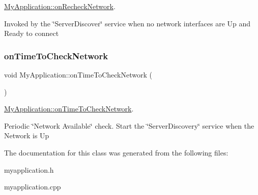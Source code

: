 \mbox{\hyperlink{classMyApplication_a5c8b62671675099c66b9e4cc887f69a5}{My\+Application\+::on\+Recheck\+Network}}. 

Invoked by the \char`\"{}\+Server\+Discover\char`\"{} service when no network interfaces are Up and Ready to connect \mbox{\label{classMyApplication_a75fa90701c6bd2d08c9c25a12776837a}} 
\subsubsection{\texorpdfstring{on\+Time\+To\+Check\+Network}{onTimeToCheckNetwork}}
{\footnotesize\ttfamily void My\+Application\+::on\+Time\+To\+Check\+Network (\begin{DoxyParamCaption}{ }\end{DoxyParamCaption})\hspace{0.3cm}{\ttfamily [slot]}}



\mbox{\hyperlink{classMyApplication_a75fa90701c6bd2d08c9c25a12776837a}{My\+Application\+::on\+Time\+To\+Check\+Network}}. 

Periodic \char`\"{}\+Network Available\char`\"{} check. Start the \char`\"{}\+Server\+Discovery\char`\"{} service when the Network is Up 

The documentation for this class was generated from the following files\+:\begin{DoxyCompactItemize}
\item 
myapplication.\+h\item 
myapplication.\+cpp\end{DoxyCompactItemize}
